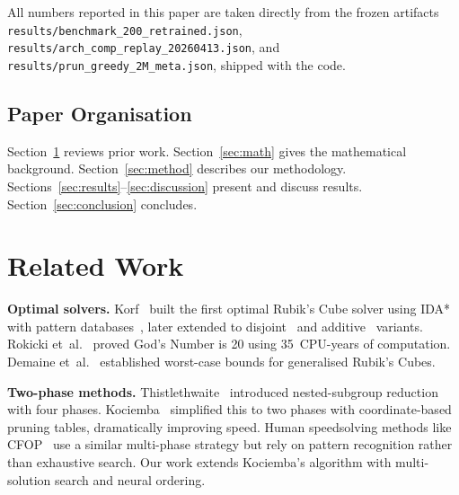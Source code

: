 \documentclass[graybox]{svmult}
\begin{document}
\begin{sloppypar}
\noindent All numbers reported in this paper are taken directly from the frozen artifacts \texttt{results/\allowbreak benchmark\_200\_\allowbreak retrained.json}, \texttt{results/\allowbreak arch\_comp\_\allowbreak replay\_\allowbreak 20260413.json}, and \texttt{results/\allowbreak prun\_greedy\_\allowbreak 2M\_meta.json}, shipped with the code.
\end{sloppypar}

\subsection{Paper Organisation}
Section~\ref{sec:related} reviews prior work. Section~\ref{sec:math} gives the mathematical background. Section~\ref{sec:method} describes our methodology. Sections~\ref{sec:results}--\ref{sec:discussion} present and discuss results. Section~\ref{sec:conclusion} concludes.

\section{Related Work}
\label{sec:related}

\textbf{Optimal solvers.}
Korf~\cite{korf1997} built the first optimal Rubik's Cube solver using IDA*~\cite{korf1985} with pattern databases~\cite{culberson1998}, later extended to disjoint~\cite{korf2002} and additive~\cite{felner2004} variants. Rokicki et~al.~\cite{godnumber} proved God's Number is 20 using 35~CPU-years of computation. Demaine et~al.~\cite{demaine2018} established worst-case bounds for generalised Rubik's Cubes.

\textbf{Two-phase methods.}
Thistlethwaite~\cite{thistlethwaite1981} introduced nested-subgroup reduction with four phases. Kociemba~\cite{kociemba} simplified this to two phases with coordinate-based pruning tables, dramatically improving speed. Human speedsolving methods like CFOP~\cite{fridrich} use a similar multi-phase strategy but rely on pattern recognition rather than exhaustive search. Our work extends Kociemba's algorithm with multi-solution search and neural ordering.
\end{document}
